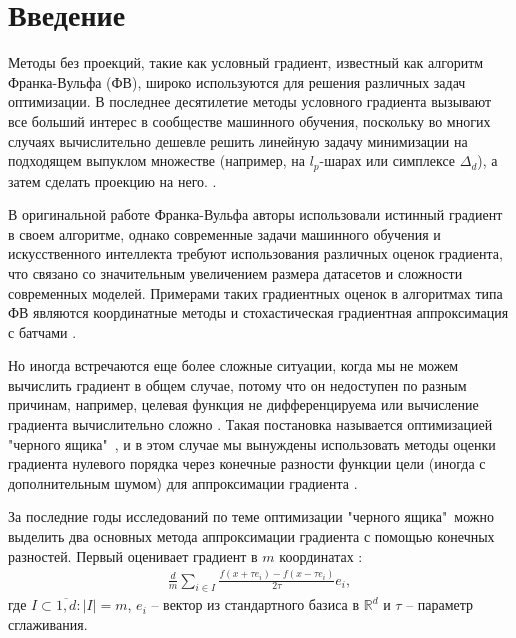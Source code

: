 \section{Введение}

    Методы без проекций, такие как условный градиент, известный как алгоритм Франка-Вульфа (ФВ)\cite{frank1956algorithm}, широко используются для решения различных задач оптимизации. В последнее десятилетие методы условного градиента вызывают все больший интерес в сообществе машинного обучения, поскольку во многих случаях вычислительно дешевле решить линейную задачу минимизации на подходящем выпуклом множестве (например, на $l_p$-шарах или симплексе $\Delta_d$), а затем сделать проекцию на него. \cite{leblanc1985improved, jaggi2011sparse, bubeck2015convex, hazan2016introduction, goldfarb2017linear, dadras2022federated, freund2017extended}.
    
    В оригинальной работе Франка-Вульфа \cite{frank1956algorithm} авторы использовали истинный градиент в своем алгоритме, однако современные задачи машинного обучения и искусственного интеллекта требуют использования различных оценок градиента, что связано со значительным увеличением размера датасетов и сложности современных моделей. Примерами таких градиентных оценок в алгоритмах типа ФВ являются координатные методы \cite{lacoste2013block, wang2016parallel, osokin2016minding} и стохастическая градиентная аппроксимация с батчами \cite{reddi2016stochastic, zhang2020one, lu2021generalized}.

    Но иногда встречаются еще более сложные ситуации, когда мы не можем вычислить градиент в общем случае, потому что он недоступен по разным причинам, например, целевая функция не дифференцируема или вычисление градиента вычислительно сложно \cite{taskar2005learning, chen2017zoo, nesterov2017random, choromanski2018structured, fazel2018global}. Такая постановка называется оптимизацией "черного ящика"\ \cite{lian2015asynchronous}, и в этом случае мы вынуждены использовать методы оценки градиента нулевого порядка через конечные разности функции цели (иногда с дополнительным шумом) для аппроксимации градиента \cite{doi:10.1137/100802001, duchi2012randomized}. 

    За последние годы исследований по теме оптимизации "черного ящика"\ можно выделить два основных метода аппроксимации градиента с помощью конечных разностей. Первый оценивает градиент в $m$ координатах \cite{richtarik2014iteration, wright2015coordinate, doi:10.1137/16M1060182}:
    \begin{align} \label{eq:turtle_approx}
        \frac{d}{m} \sum_{i \in I} \frac{f(x + \tau e_i) - f(x - \tau e_i)}{2 \tau} e_i,
    \end{align} 
    где $I \subset \overline{1, d} : |I| = m$, $e_i$ -- вектор из стандартного базиса в $\mathbb{R}^d$ и $\tau$ -- параметр сглаживания.
    
